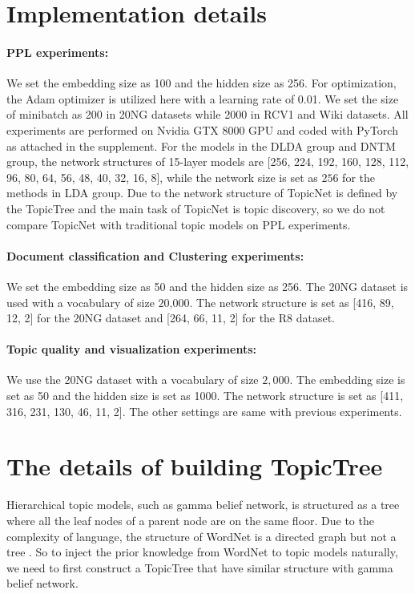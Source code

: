 \documentclass{article}
\begin{document}
\section{Implementation details}
\paragraph{PPL experiments:} We set the embedding size as 100 and the hidden size as 256. For optimization, the Adam optimizer is utilized here \citep{kingma2014adam} with a learning rate of 0.01. We set the size of minibatch as 200 in 20NG datasets while 2000 in RCV1 and Wiki datasets. All experiments are performed on Nvidia GTX 8000 GPU and coded with PyTorch as attached in the supplement. For the models in the DLDA group and DNTM group, the network structures of 15-layer models are [256, 224, 192, 160, 128, 112, 96, 80, 64, 56, 48, 40, 32, 16, 8], while the network size is set as $\text{256}$ for the methods in LDA group. Due to the network structure of TopicNet is defined by the TopicTree and the main task of TopicNet is topic discovery, so we do not compare TopicNet with traditional topic models on PPL experiments.

\paragraph{Document classification and Clustering experiments:} We set the embedding size as 50 and the hidden size as 256. The 20NG dataset is used with a vocabulary  of size $\text{20,000}$. The network structure is set as [416, 89, 12, 2] for the 20NG dataset and [264, 66, 11, 2] for the R8 dataset. 

\paragraph{Topic quality and visualization experiments:} We use the 20NG dataset with a vocabulary of size $2,000$. The embedding size is set as 50 and the hidden size is set as 1000. The network structure is set as [411, 316, 231, 130, 46, 11, 2]. The other settings are same with previous experiments. 

\section{The details of building TopicTree}
Hierarchical topic models, such as gamma belief network, is structured as a tree where all the leaf nodes of a parent node are on the same floor. 
Due to the complexity of language, the structure of WordNet \cite{miller1995wordnet} is a directed graph but not a tree \cite{redmon2017yolo9000}. So to inject the prior knowledge from WordNet to topic models naturally, we need to first construct a TopicTree that have similar structure with gamma belief network.
\end{document}
